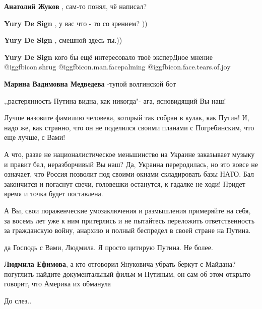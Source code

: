 \begin{itemize}
\begin{itemize}
\textbf{Анатолий Жуков} , сам-то понял, чё написал?

\textbf{Yury De Sign} , у вас что - то со зрением? ))

\textbf{Yury De Sign} , смешной здесь ты.))

\textbf{Yury De Sign} кого бы ещё интересовало твоё эксперДное мнение @igg{fbicon.shrug}  @igg{fbicon.man.facepalming}  @igg{fbicon.face.tears.of.joy} 

\textbf{Марина Вадимовна Медведева} -тупой волгинской бот
\end{itemize} %


,,растерянность Путина видна, как никогда"- ага, ясновидящий Вы наш!

Лучше назовите фамилию человека, который так собран в кулак, как Путин! И, надо
же, как странно, что он не поделился своими планами с Погребинским, что еще
лучше, с Вами!

А что, разве не националистическое меньшинство на Украине заказывает музыку и
правит бал, неразборчивый Вы наш? Да, Украина переродилась, но это вовсе не
означает, что Россия позволит под своими окнами складировать базы НАТО. Бал
закончится и погаснут свечи, головешки останутся, к гадалке не ходи! Придет
время и точка будет поставлена.

А Вы, свои пораженческие умозаключения и размышления примеряйте на себя, за
восемь лет уже к ним притерлись и не пытайтесь переложить ответственность за
гражданскую войну, анархию и полный беспредел в своей стране на Путина.

\begin{itemize} %
да Господь с Вами, Людмила. Я просто цитирую Путина. Не более.

\textbf{Людмила Ефимова}, а кто отговорил Януковича убрать беркут с Майдана? погуглить найдите документальный фильм м Путиным, он сам об этом открыто говорит, что Америка их обманула
\end{itemize} %

До слез..

\end{itemize} %
